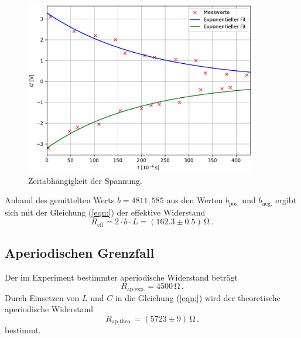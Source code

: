 \begin{figure}[H]
  \centering
  \includegraphics[width=0.90\textwidth]{plot_a.pdf}
  \caption{Zeitabhängigkeit der Spannung.}
  \label{fig:gedämpfteSchwingung}
\end{figure}
Anhand des gemittelten Werts $b = 4811,585$ aus den Werten $b_{\text{pos.}}$ und $b_{\text{neg.}}$ ergibt sich mit der Gleichung (\ref{eqn:})
der effektive Widerstand 
$$R_{\text{eff}} = 2\cdot b\cdot L = \left(162.3\pm0.5\right)\,\unit{\ohm}\,.$$
\subsection{Aperiodischen Grenzfall}
Der im Experiment bestimmter aperiodische Widerstand beträgt
$$R_{\text{ap,exp.}} = 4500\,\unit{\ohm}\,.$$
Durch Einsetzen von $L$ und $C$ in die Gleichung (\ref{eqn:}) wird der theoretische aperiodische Widerstand
$$R_{\text{ap,theo.}} = (5723\pm9)\,\unit{\ohm}\,.$$ bestimmt.

